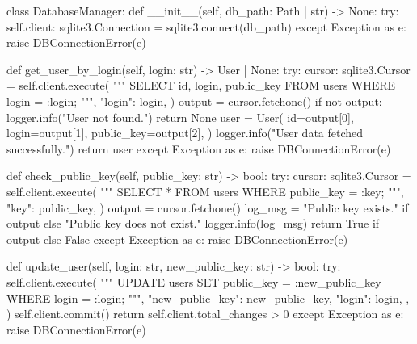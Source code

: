 \documentclass[../main.tex]{subfiles}
\begin{document}
\begin{mypython}[caption={Implementacja menadżera bazy danych},label={lst:python_database_management}]
class DatabaseManager:
    def __init__(self, db_path: Path | str) -> None:
        try:
            self.client: sqlite3.Connection = sqlite3.connect(db_path)
        except Exception as e:
            raise DBConnectionError(e)

    def get_user_by_login(self, login: str) -> User | None:
        try:
            cursor: sqlite3.Cursor = self.client.execute(
                """
                SELECT
                    id, login, public_key
                FROM
                    users
                WHERE
                    login = :login;
                """,
                {"login": login},
            )
            output = cursor.fetchone()
            if not output:
                logger.info("User not found.")
                return None
            user = User(
                id=output[0],
                login=output[1],
                public_key=output[2],
            )
            logger.info("User data fetched successfully.")
            return user
        except Exception as e:
            raise DBConnectionError(e)

    def check_public_key(self, public_key: str) -> bool:
        try:
            cursor: sqlite3.Cursor = self.client.execute(
                """
                SELECT
                    *
                FROM
                    users
                WHERE
                    public_key = :key;
                """,
                {"key": public_key},
            )
            output = cursor.fetchone()
            log_msg = "Public key exists." if output else "Public key does not exist."
            logger.info(log_msg)
            return True if output else False
        except Exception as e:
            raise DBConnectionError(e)

    def update_user(self, login: str, new_public_key: str) -> bool:
        try:
            self.client.execute(
                """
                UPDATE
                    users
                SET
                    public_key = :new_public_key
                WHERE
                    login = :login;
                """,
                {
                    "new_public_key": new_public_key,
                    "login": login,
                },
            )
            self.client.commit()
            return self.client.total_changes > 0
        except Exception as e:
            raise DBConnectionError(e)


\end{mypython}
\end{document}
